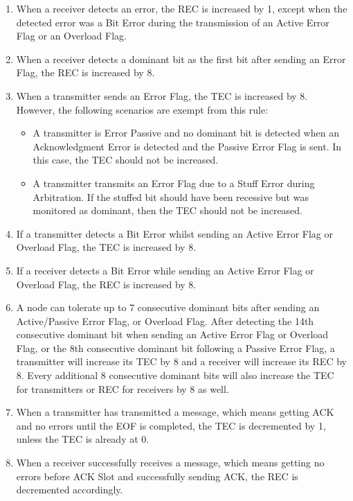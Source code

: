 \documentclass[main\_\_EN.tex]{subfiles}
\begin{document}
\begin{enumerate}
    \item When a receiver detects an error, the REC is increased by 1, except when the detected error was a Bit Error during the transmission of an Active Error Flag or an Overload Flag.
    \item When a receiver detects a dominant bit as the first bit after sending an Error Flag, the REC is increased by 8.
    \item When a transmitter sends an Error Flag, the TEC is increased by 8. However, the following scenarios are exempt from this rule:
    \begin{itemize}
        \item A transmitter is Error Passive and no dominant bit is detected when an Acknowledgment Error is detected and the Passive Error Flag is sent. In this case, the TEC should not be increased.
        \item A transmitter transmits an Error Flag due to a Stuff Error during Arbitration. If the stuffed bit should have been recessive but was monitored as dominant, then the TEC should not be increased.
    \end{itemize}
    \item If a transmitter detects a Bit Error whilst sending an Active Error Flag or Overload Flag, the TEC is increased by 8.
    \item If a receiver detects a Bit Error while sending an Active Error Flag or Overload Flag, the REC is increased by 8.
    \item A node can tolerate up to 7 consecutive dominant bits after sending an Active/Passive Error Flag, or Overload Flag. After detecting the 14th consecutive dominant bit when sending an Active Error Flag or Overload Flag, or the 8th consecutive dominant bit following a Passive Error Flag, a transmitter will increase its TEC by 8 and a receiver will increase its REC by 8. Every additional 8 consecutive dominant bits will also increase the TEC for transmitters or REC for receivers by 8 as well.
    \item When a transmitter has transmitted a message, which means getting ACK and no errors until the EOF is completed, the TEC is decremented by 1, unless the TEC is already at 0.
    \item When a receiver successfully receives a message, which means getting no errors before ACK Slot and successfully sending ACK, the REC is decremented accordingly.
    \begin{itemize}

\end{itemize}
\end{enumerate}
\end{document}
